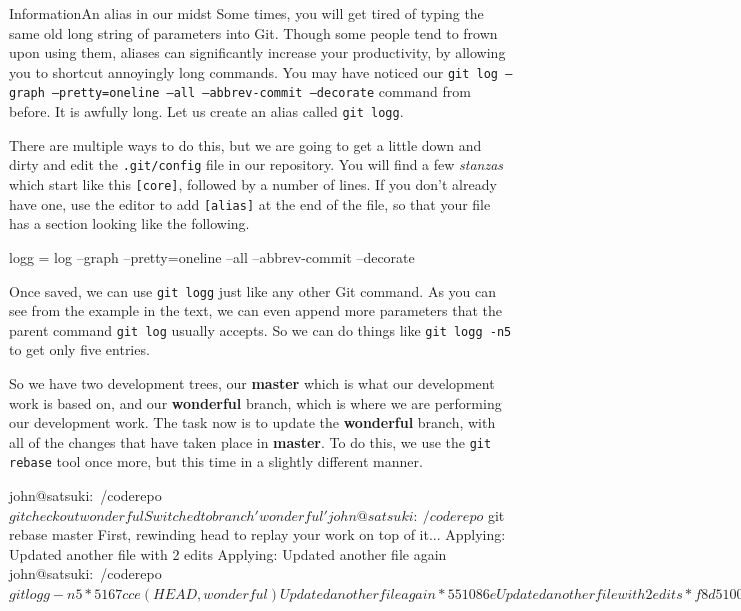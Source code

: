 \begin{callout}{Information}{An alias in our midst}
Some times, you will get tired of typing the same old long string of parameters into Git.
Though some people tend to frown upon using them, aliases can significantly increase your productivity, by allowing you to shortcut annoyingly long commands.
You may have noticed our \texttt{git log --graph --pretty=oneline --all --abbrev-commit --decorate} command from before.
It is awfully long.
Let us create an alias called \texttt{git logg}.

There are multiple ways to do this, but we are going to get a little down and dirty and edit the \texttt{.git/config} file in our repository.
You will find a few \emph{stanzas} which start like this \texttt{[core]}, followed by a number of lines.
If you don't already have one, use the editor to add \texttt{[alias]} at the end of the file, so that your file has a section looking like the following.

\begin{code}
[alias]
        logg = log --graph --pretty=oneline --all --abbrev-commit --decorate
\end{code}

Once saved, we can use \texttt{git logg} just like any other Git command.
As you can see from the example in the text, we can even append more parameters that the parent command \texttt{git log} usually accepts.
So we can do things like \texttt{git logg -n5} to get only five entries.
\end{callout}

So we have two development trees, our \textbf{master} which is what our development work is based on, and our \textbf{wonderful} branch, which is where we are performing our development work.
The task now is to update the \textbf{wonderful} branch, with all of the changes that have taken place in \textbf{master}.
To do this, we use the \texttt{git rebase} tool once more, but this time in a slightly different manner.

\begin{code}
john@satsuki:~/coderepo$ git checkout wonderful
Switched to branch 'wonderful'
john@satsuki:~/coderepo$ git rebase master
First, rewinding head to replay your work on top of it...
Applying: Updated another file with 2 edits
Applying: Updated another file again
john@satsuki:~/coderepo$ git logg -n5
* 5167cce (HEAD, wonderful) Updated another file again
* 551086e Updated another file with 2 edits
* f8d5100 (master) Finished new dev
* 1968324 Start new dev
* 1c3206a Added a new file
john@satsuki:~/coderepo$
\end{code}

